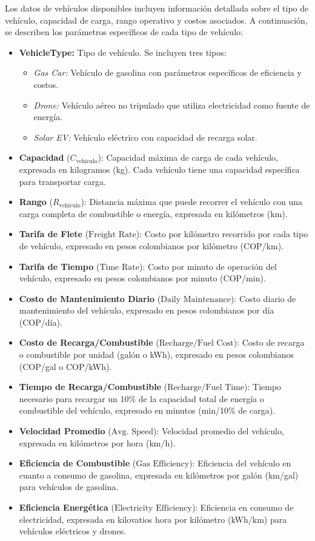 \documentclass[12pt]{article}
\begin{document}
Los datos de vehículos disponibles incluyen información detallada sobre el tipo de vehículo, capacidad de carga, rango operativo y costos asociados. A continuación, se describen los parámetros específicos de cada tipo de vehículo:

\begin{itemize}
    \item \textbf{VehicleType:} Tipo de vehículo. Se incluyen tres tipos:
    \begin{itemize}
        \item \textit{Gas Car:} Vehículo de gasolina con parámetros específicos de eficiencia y costos.
        \item \textit{Drone:} Vehículo aéreo no tripulado que utiliza electricidad como fuente de energía.
        \item \textit{Solar EV:} Vehículo eléctrico con capacidad de recarga solar.
    \end{itemize}
    \item \textbf{Capacidad} ($C_{\text{vehículo}}$): Capacidad máxima de carga de cada vehículo, expresada en kilogramos (kg). Cada vehículo tiene una capacidad específica para transportar carga.
    \item \textbf{Rango} ($R_{\text{vehículo}}$): Distancia máxima que puede recorrer el vehículo con una carga completa de combustible o energía, expresada en kilómetros (km).
    \item \textbf{Tarifa de Flete} ($\text{Freight Rate}$): Costo por kilómetro recorrido por cada tipo de vehículo, expresado en pesos colombianos por kilómetro (COP/km).
    \item \textbf{Tarifa de Tiempo} ($\text{Time Rate}$): Costo por minuto de operación del vehículo, expresado en pesos colombianos por minuto (COP/min).
    \item \textbf{Costo de Mantenimiento Diario} ($\text{Daily Maintenance}$): Costo diario de mantenimiento del vehículo, expresado en pesos colombianos por día (COP/día).
    \item \textbf{Costo de Recarga/Combustible} ($\text{Recharge/Fuel Cost}$): Costo de recarga o combustible por unidad (galón o kWh), expresado en pesos colombianos (COP/gal o COP/kWh).
    \item \textbf{Tiempo de Recarga/Combustible} ($\text{Recharge/Fuel Time}$): Tiempo necesario para recargar un 10\% de la capacidad total de energía o combustible del vehículo, expresado en minutos (min/10\% de carga).
    \item \textbf{Velocidad Promedio} ($\text{Avg. Speed}$): Velocidad promedio del vehículo, expresada en kilómetros por hora (km/h).
    \item \textbf{Eficiencia de Combustible} ($\text{Gas Efficiency}$): Eficiencia del vehículo en cuanto a consumo de gasolina, expresada en kilómetros por galón (km/gal) para vehículos de gasolina.
    \item \textbf{Eficiencia Energética} ($\text{Electricity Efficiency}$): Eficiencia en consumo de electricidad, expresada en kilovatios hora por kilómetro (kWh/km) para vehículos eléctricos y drones.
\end{itemize}
\end{document}
